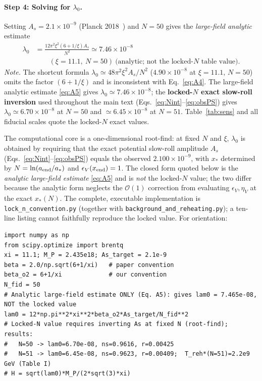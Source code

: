 \documentclass[pdflatex,sn-mathphys-num]{sn-jnl}
\theoremstyle{thmstyleone}
\begin{document}
\begin{appendices}
\paragraph{Step 4: Solving for $\lambda_0$.} Setting $A_s=2.1\times10^{-9}$ (Planck 2018~\cite{Planck2018}) and $N=50$ gives the \emph{large-field analytic} estimate
\begin{equation}
\begin{aligned}
\lambda_0&=\frac{12\pi^2\xi^2(6+1/\xi)A_s}{N^2}\simeq7.46\times10^{-8}\\
&\qquad(\xi=11.1,\ N=50)\ \text{(analytic; not the locked-$N$ table value)}.
\end{aligned}
\label{eq:A5}
\end{equation}
\emph{Note.} The shortcut formula $\lambda_0\simeq48\pi^2\xi^2A_s/N^2$ ($4.90\times10^{-8}$ at $\xi=11.1$, $N=50$) omits the factor $(6+1/\xi)$ and is inconsistent with Eq.~\eqref{eq:A4}. The large-field analytic estimate \eqref{eq:A5} gives $\lambda_0\simeq7.46\times10^{-8}$; the \textbf{locked-$N$ exact slow-roll inversion} used throughout the main text (Eqs.~\eqref{eq:Nint}--\eqref{eq:obsPS}) gives $\lambda_0\simeq6.70\times10^{-8}$ at $N=50$ and $\simeq6.45\times10^{-8}$ at $N=51$. Table~\ref{tab:sens} and all fiducial scales quote the locked-$N$ exact values.

The computational core is a one-dimensional root-find: at fixed $N$ and $\xi$, $\lambda_0$ is obtained by requiring that the exact potential slow-roll amplitude $A_s$ (Eqs.~\eqref{eq:Nint}--\eqref{eq:obsPS}) equals the observed $2.100\times10^{-9}$, with $x_*$ determined by $N=\ln(a_{\rm end}/a_*)$ and $\epsilon_V(x_{\rm end})=1$. The closed form quoted below is the \emph{analytic large-field estimate} \eqref{eq:A5} and is \emph{not} the locked-$N$ value; the two differ because the analytic form neglects the $\mathcal{O}(1)$ correction from evaluating $\epsilon_V,\eta_V$ at the exact $x_*(N)$. The complete, executable implementation is \texttt{lock\_n\_convention.py} (together with \texttt{background\_and\_reheating.py}); a ten-line listing cannot faithfully reproduce the locked value. For orientation:
{\footnotesize
\begin{verbatim}
import numpy as np
from scipy.optimize import brentq
xi = 11.1; M_P = 2.435e18; As_target = 2.1e-9
beta = 2.0/np.sqrt(6+1/xi)   # paper convention
beta_o2 = 6+1/xi             # our convention
N_fid = 50
# Analytic large-field estimate ONLY (Eq. A5): gives lam0 = 7.465e-08, NOT the locked value
lam0 = 12*np.pi**2*xi**2*beta_o2*As_target/N_fid**2
# Locked-N value requires inverting As at fixed N (root-find); results:
#   N=50 -> lam0=6.70e-08, ns=0.9616, r=0.00425
#   N=51 -> lam0=6.45e-08, ns=0.9623, r=0.00409;  T_reh*(N=51)=2.2e9 GeV (Table I)
# H = sqrt(lam0)*M_P/(2*sqrt(3)*xi)
\end{verbatim}}


\end{appendices}
\end{document}
